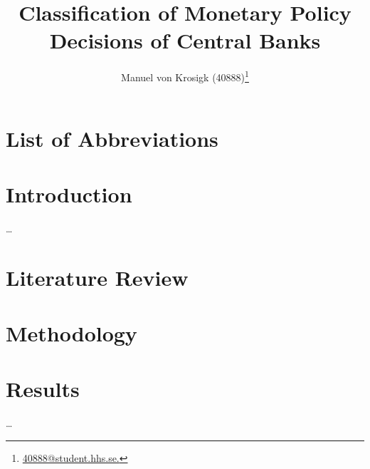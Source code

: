 \documentclass[%
a4paper, 12pt, DIV=calc, BCOR5mm,abstracton]{scrartcl}
\title{Classification of Monetary Policy Decisions of Central Banks}
\author{Manuel von Krosigk (40888)\footnote{\href{mailto:40888@student.hhs.se.}{40888@student.hhs.se.}}}
\newcounter{SeitenzahlSpeicher}
\begin{document}

\thispagestyle{empty}

\newpage

	
\renewcommand{\baselinestretch}{1.08}\normalsize %
\tableofcontents
\renewcommand{\baselinestretch}{1.0}\onehalfspacing
%
\clearpage
\section*{List of Abbreviations} 

\listoffigures  {} 
\listoftables {}


\clearpage
\setcounter{SeitenzahlSpeicher}{\value{page}}



\section{Introduction} \label{ch:Intro}
\dots%

\section{Literature Review} \label{ch:Lit}


\section{Methodology} \label{ch:Meth}


\section{Results} \label{ch:Res}
\dots%
\end{document}
